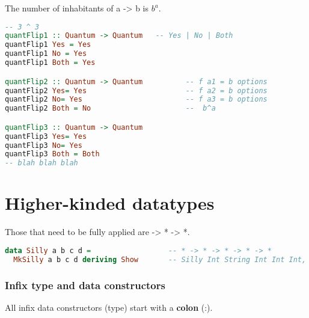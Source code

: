 \documentclass{article}
\begin{document}
The number of inhabitants of {\selectfont a -> b} is $b^a$.

\begin{lstlisting}[language = Haskell]
-- 3 ^ 3
quantFlip1 :: Quantum -> Quantum   -- Yes | No | Both
quantFlip1 Yes = Yes
quantFlip1 No = Yes
quantFlip1 Both = Yes

quantFlip2 :: Quantum -> Quantum          -- f a1 = b options
quantFlip2 Yes= Yes                       -- f a2 = b options
quantFlip2 No= Yes                        -- f a3 = b options
quantFlip2 Both = No                      --  b^a

quantFlip3 :: Quantum -> Quantum
quantFlip3 Yes= Yes
quantFlip3 No= Yes
quantFlip3 Both = Both
-- blah blah blah \end{lstlisting}
 
\section{Higher-kinded datatypes}

Those that need to be fully applied are {\selectfont * -> * -> *}.
\begin{lstlisting}[language = Haskell]
data Silly a b c d =                  -- * -> * -> * -> * -> *
  MkSilly a b c d deriving Show       -- Silly Int String Int Int Int, or (,,,,)
\end{lstlisting}
\subsubsection*{Infix type and data constructors}

All infix data constructors (type) start with a \textbf{colon} {\selectfont (:)}.
\end{document}
